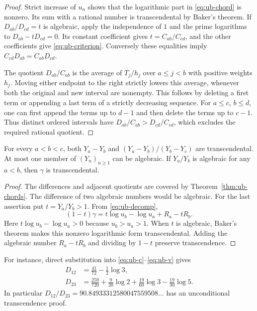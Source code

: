 \documentclass[11pt,a4paper]{article}
\theoremstyle{definition}\newtheorem{definition}[theorem]{Definition}\newtheorem{example}[theorem]{Example}
\theoremstyle{remark}\newtheorem{remark}[theorem]{Remark}
\begin{document}
\begin{proof}
Strict increase of $u_n$ shows that the logarithmic part in
\eqref{eq:ub-chord} is nonzero. Its sum with a rational number is
transcendental by Baker's theorem. If $D_{ab}/D_{cd}=t$ is
algebraic, apply the independence of $1$ and the prime logarithms to
$D_{ab}-tD_{cd}=0$. Its constant coefficient gives
$t=C_{ab}/C_{cd}$, and the other coefficients give
\eqref{eq:ub-criterion}. Conversely these equalities imply
$C_{cd}D_{ab}=C_{ab}D_{cd}$.

The quotient $D_{ab}/C_{ab}$ is the average of $T_j/h_j$ over
$a\le j<b$ with positive weights $h_j$. Moving either endpoint to
the right strictly lowers this average, whenever both the original
and new interval are nonempty. This follows by deleting a first term
or appending a last term of a strictly decreasing sequence.
For $a\le c$, $b\le d$, one can first append the terms up to $d-1$
and then delete the terms up to $c-1$. Thus distinct ordered intervals
have $D_{ab}/C_{ab}>D_{cd}/C_{cd}$, which excludes the required
rational quotient.
\end{proof}

\begin{corollary}
\label{cor:ub-triple}
For every $a<b<c$, both $Y_a-Y_b$ and
$(Y_a-Y_b)/(Y_b-Y_c)$ are transcendental. At most one member of
$(Y_n)_{n\ge1}$ can be algebraic. If $Y_a/Y_b$ is algebraic for
any $a<b$, then $\gamma$ is transcendental.
\end{corollary}

\begin{proof}
The differences and adjacent quotients are covered by
Theorem~\ref{thm:ub-chords}. The difference of two algebraic
numbers would be algebraic. For the last assertion put $t=Y_a/Y_b>1$.
From \eqref{eq:ub-decomp},
\[
 (1-t)\gamma=t\log u_b-\log u_a+R_a-tR_b .
\]
Here $t\log u_b-\log u_a>0$ because $u_b>u_a>1$. When $t$ is
algebraic, Baker's theorem makes this nonzero logarithmic form
transcendental. Adding the algebraic number $R_a-tR_b$ and dividing
by $1-t$ preserve transcendence.
\end{proof}

For instance, direct substitution into \eqref{eq:ub-c}--\eqref{eq:ub-v}
gives
\begin{align*}
 D_{12}&=\frac{41}{72}-\frac12\log3,\\
 D_{23}&=\frac{259}{720}+\frac9{20}\log2
           +\frac{19}{60}\log3-\frac{19}{30}\log5 .
\end{align*}
In particular $D_{12}/D_{23}=90.84933312580047559508\ldots$ has
an unconditional transcendence proof.
\end{document}
